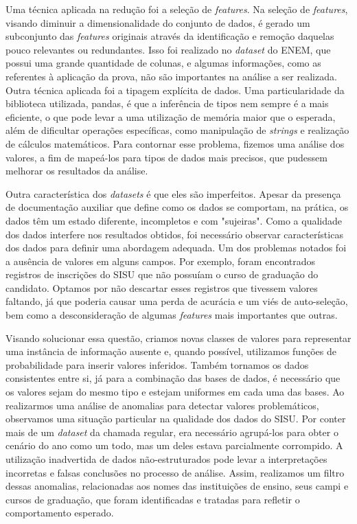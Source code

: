 Uma técnica aplicada na redução foi a seleção de \textit{features}. Na seleção de \textit{features}, visando diminuir a dimensionalidade
 do conjunto de dados, é gerado um subconjunto das \textit{features} originais através da identificação e remoção daquelas pouco relevantes
ou redundantes. Isso foi realizado no \textit{dataset} do ENEM, que possui uma grande quantidade de colunas, e algumas informações, 
como as referentes à aplicação da prova, não são importantes na análise a ser realizada. 
Outra técnica aplicada foi a tipagem explícita de dados. Uma particularidade da biblioteca utilizada, pandas, é que a inferência de tipos 
nem sempre é a mais eficiente, o que pode levar a uma utilização de memória maior que o esperada, além de dificultar operações específicas, 
como manipulação de \textit{strings} e realização de cálculos matemáticos. Para contornar esse problema, fizemos uma análise dos valores, a fim de mapeá-los
para tipos de dados mais precisos, que pudessem melhorar os resultados da análise.

Outra característica dos \textit{datasets} é que eles são imperfeitos. Apesar da presença de documentação auxiliar que define como os dados se comportam, na prática, os dados têm um estado diferente, incompletos e com "sujeiras". Como a qualidade dos dados interfere nos resultados obtidos, foi necessário observar características dos dados para definir uma abordagem adequada.
Um dos problemas notados foi a ausência de valores em alguns campos. Por exemplo, foram encontrados registros de inscrições do SISU que não possuíam o curso de graduação do candidato. Optamos por não descartar esses registros que tivessem valores faltando, já que poderia causar uma perda de acurácia e um viés de auto-seleção, bem como a desconsideração de algumas \textit{features} mais importantes que outras. 

Visando solucionar essa questão, criamos novas classes de valores para representar uma instância de informação ausente e, quando possível, utilizamos funções de probabilidade para inserir valores inferidos. Também tornamos os dados consistentes entre si, já para a combinação das bases de dados, é necessário que os valores sejam do mesmo tipo e estejam uniformes em cada uma das bases. Ao realizarmos uma análise de anomalias para detectar valores problemáticos, observamos uma situação particular na qualidade dos dados do SISU. Por conter mais de um \textit{dataset} da chamada regular, era necessário agrupá-los para obter o cenário do ano como um todo, mas um deles estava parcialmente corrompido. A utilização inadvertida de dados não-estruturados pode levar a interpretações incorretas e falsas conclusões no processo de análise. Assim, realizamos um filtro dessas anomalias, relacionadas aos nomes das instituições de ensino, seus campi e cursos de graduação, que foram identificadas e tratadas para refletir o comportamento esperado. 

